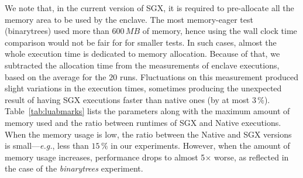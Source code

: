 We note that, in the current version of SGX, it is required to pre-allocate all the memory area to be used by the enclave.
The most memory-eager test (\textsf{binarytrees}) used more than $600\,MB$ of memory, hence using the wall clock time comparison would not be fair for for smaller tests.
In such cases, almost the whole execution time is dedicated to memory allocation.
Because of that, we subtracted the allocation time from the measurements of enclave executions, based on the average for the $20$ runs.
Fluctuations on this measurement produced slight variations in the execution times, sometimes producing the unexpected result of having SGX executions faster than native ones (by at most $3\,\%$).
Table~\ref{tab:luabmarks} lists the parameters along with the maximum amount of memory used and the ratio between runtimes of SGX and Native executions.
When the memory usage is low, the ratio between the Native and SGX versions is small---\emph{e.g.}, less than $15\,\%$ in our experiments.
However, when the amount of memory usage increases, performance drops to almost 5$\times$ worse, as reflected in the case of the \emph{binarytrees} experiment.

